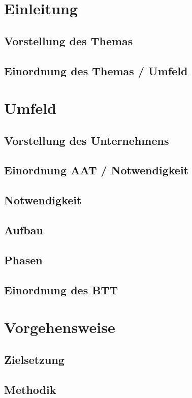 \documentclass[12pt, titlepage]{article}
\begin{document}
\doublespacing





\section{Einleitung}
\subsection{Vorstellung des Themas}
\subsection{Einordnung des Themas / Umfeld}

\newpage
\section{Umfeld}
\subsection{Vorstellung des Unternehmens}
\subsection{Einordnung AAT / Notwendigkeit}
\subsection{Notwendigkeit}
\subsection{Aufbau}
\subsection{Phasen}
\subsection{Einordnung des BTT}

\newpage
\section{Vorgehensweise}
\subsection{Zielsetzung}
\subsection{Methodik}
\end{document}
